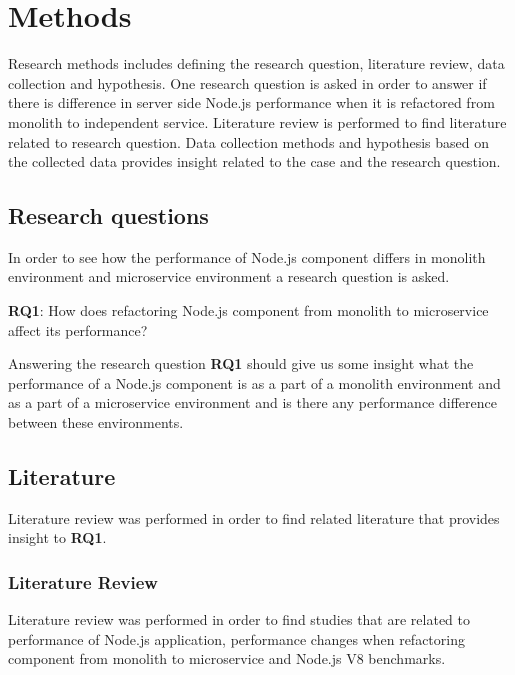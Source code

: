 \chapter{Methods\label{methods}}
Research methods includes defining the research question, literature review, data collection and hypothesis.
One research question is asked in order to answer if there is difference in server side Node.js performance when it is refactored from monolith to independent service.
Literature review is performed to find literature related to research question.
Data collection methods and hypothesis based on the collected data provides insight related to the case and the research question.


\section{Research questions}
In order to see how the performance of Node.js component differs in monolith environment and microservice environment a research question is asked.

\textbf{RQ1}: How does refactoring Node.js component from monolith to microservice affect its performance?

Answering the research question \textbf{RQ1} should give us some insight what the performance of a Node.js component is as a part of a monolith environment and as a part of a microservice environment and is there any performance difference between these environments.


\section{Literature}
Literature review was performed in order to find related literature that provides insight to \textbf{RQ1}.

\subsection{Literature Review}
Literature review was performed in order to find studies that are related to performance of Node.js application, performance changes when refactoring component from monolith to microservice and Node.js V8 benchmarks.

